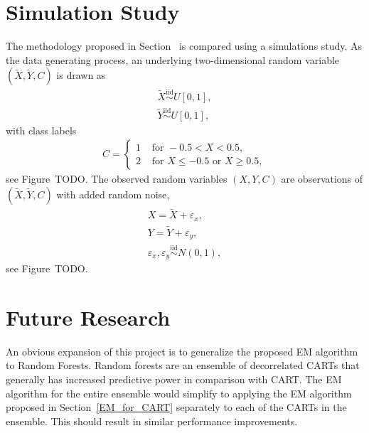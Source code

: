 \documentclass[12pt, twoside]{article}
\newcommand{\1}{\mathbb{1}}
\newcommand{\iid}{\overset{\text{iid}}{\sim}}
\begin{document}

\section{Simulation Study}
The methodology proposed in Section~\label{treatment_of_missing_values_in_cart} is compared using a simulations study.
As the data generating process, an underlying two-dimensional random variable $(\tilde X, \tilde Y, C)$ is drawn as
\begin{eqnarray}
\tilde X \iid U[0, 1], \nonumber \\
\tilde Y \iid U[0, 1],
\end{eqnarray}
with class labels 
\begin{eqnarray}
C = 
\begin{cases}
1 & \text{ for } -0.5 < X < 0.5, \\
2 & \text{ for } X \leq -0.5 \text{ or } X \geq 0.5,
\end{cases}
\end{eqnarray}
see Figure~TODO.
%
The observed random variables $(X, Y, C)$ are observations of $(\tilde X, \tilde Y, C)$ with added random noise, 
\begin{eqnarray}
X = \tilde X + \varepsilon_x, \nonumber \\
Y = \tilde Y + \varepsilon_y, \nonumber \\
\varepsilon_x, \varepsilon_y \iid N(0, 1),
\end{eqnarray}
see Figure~TODO.
%



\section{Future Research}
An obvious expansion of this project is to generalize the proposed EM algorithm to Random Forests. Random forests are an ensemble of decorrelated CARTs \citep{breiman} that generally has increased predictive power in comparison with CART.
The EM algorithm for the entire ensemble would simplify to applying the EM algorithm proposed in Section~\ref{EM_for_CART} separately to each of the CARTs in the ensemble. This should result in similar performance improvements.



\clearpage
 
{}

\end{document}
